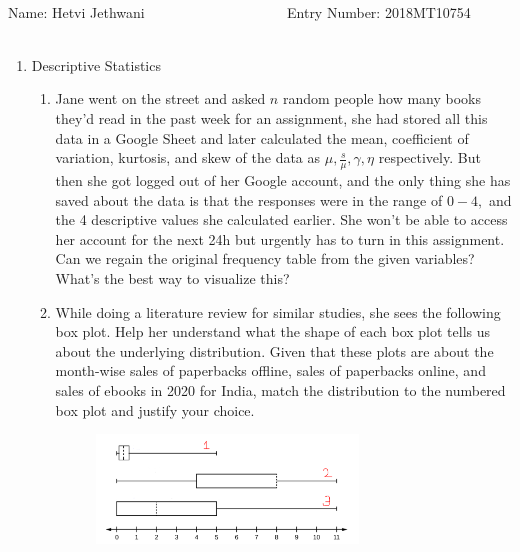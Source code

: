\documentclass[12pt, oneside]{article}
\begin{document}
\setlength{\textheight}{8.5in}
\\





\vskip 0.5cm

\noindent Name: Hetvi Jethwani ~~~~~~~~~~~~~~~~~~~ Entry Number: 2018MT10754 ~~~~~~~~~~~~~~



\vskip 0.5cm



\begin{enumerate}

\item Descriptive Statistics
\begin{enumerate}
    \item Jane went on the street and asked $n$ random people how many books they'd read in the past week for an assignment, she had stored all this data in a Google Sheet and later calculated the mean, coefficient of variation, kurtosis, and skew of the data as $\mu, \frac{s}{\mu},\gamma,\eta$ respectively. But then she got logged out of her Google account, and the only thing she has saved about the data is that the responses were in the range of $0-4,$ and the 4 descriptive values she calculated earlier. She won't be able to access her account for the next 24h but urgently has to turn in this assignment. Can we regain the original frequency table from the given variables? What's the best way to visualize this?
    \item While doing a literature review for similar studies, she sees the following box plot. Help her understand what the shape of each box plot tells us about the underlying distribution. Given that these plots are about the month-wise sales of paperbacks offline, sales of paperbacks online, and sales of ebooks in 2020 for India, match the distribution to the numbered box plot and justify your choice. 
    \begin{figure}[!ht]
        \centering
        \includegraphics[width=0.7\textwidth]{boxplot_qna.PNG}

\end{figure}
\end{enumerate}
\end{enumerate}
\end{document}

